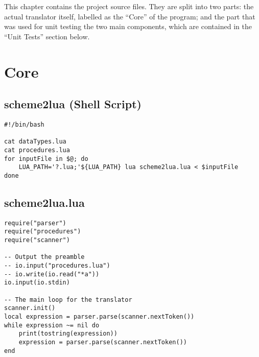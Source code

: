 \label{sec:sourcecode}
This chapter contains the project source files. They are split into two parts:
the actual translator itself, labelled as the ``Core'' of the program; and the
part that was used for unit testing the two main components, which are contained
in the ``Unit Tests'' section below.

\section{Core}
\subsection{scheme2lua (Shell Script)}

\scriptsize

\begin{verbatim}
#!/bin/bash

cat dataTypes.lua
cat procedures.lua
for inputFile in $@; do
    LUA_PATH='?.lua;'${LUA_PATH} lua scheme2lua.lua < $inputFile
done
\end{verbatim}

\subsection{scheme2lua.lua}
\begin{verbatim}
require("parser")
require("procedures")
require("scanner")

-- Output the preamble
-- io.input("procedures.lua")
-- io.write(io.read("*a"))
io.input(io.stdin)

-- The main loop for the translator
scanner.init()
local expression = parser.parse(scanner.nextToken())
while expression ~= nil do
    print(tostring(expression))
    expression = parser.parse(scanner.nextToken())
end
\end{verbatim}

